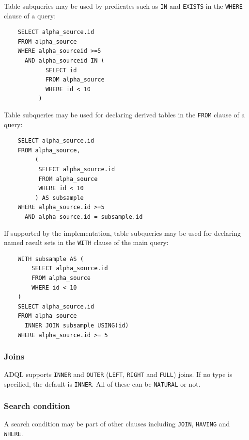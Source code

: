 \documentclass[11pt,a4paper]{ivoa}
\begin{document}
Table subqueries may be used by predicates such as \verb:IN: and \verb:EXISTS:
in the \verb:WHERE: clause of a query:

\begin{verbatim}
    SELECT alpha_source.id
    FROM alpha_source
    WHERE alpha_sourceid >=5
      AND alpha_sourceid IN (
            SELECT id
            FROM alpha_source
            WHERE id < 10
          )
\end{verbatim}

Table subqueries may be used for declaring derived tables in the \verb:FROM: clause
of a query:

\begin{verbatim}
    SELECT alpha_source.id
    FROM alpha_source,
         (
          SELECT alpha_source.id
          FROM alpha_source
          WHERE id < 10
         ) AS subsample
    WHERE alpha_source.id >=5
      AND alpha_source.id = subsample.id
\end{verbatim}

If supported by the implementation, table subqueries may be used for declaring
named result sets in the \verb:WITH: clause of the main query:

\begin{verbatim}
    WITH subsample AS (
        SELECT alpha_source.id
        FROM alpha_source
        WHERE id < 10
    )
    SELECT alpha_source.id
    FROM alpha_source
      INNER JOIN subsample USING(id)
    WHERE alpha_source.id >= 5
\end{verbatim}

\subsubsection{Joins}
\label{sec:joins}

ADQL supports \verb:INNER: and \verb:OUTER:
(\verb:LEFT:, \verb:RIGHT: and \verb:FULL:) joins. If no type is specified, the
default is \verb:INNER:. All of these can be \verb:NATURAL: or not.


\subsubsection{Search condition}
\label{sec:search}

A search condition may be part of other clauses including \verb:JOIN:, \verb:HAVING: and \verb:WHERE:.
\end{document}
